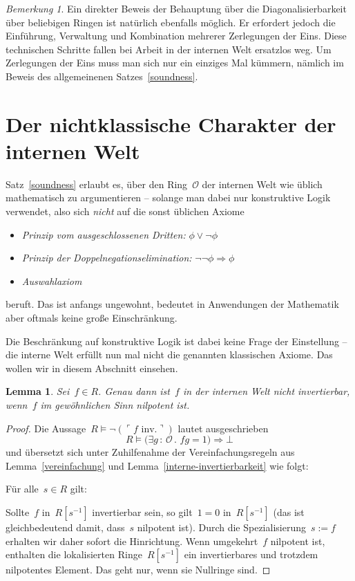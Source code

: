 \documentclass[a4paper,ngerman,12pt]{scrartcl}
\theoremstyle{definition}
\theoremstyle{plain}
\newtheorem{lemma}[defn]{Lemma}
\theoremstyle{remark}
\newtheorem{bem}[defn]{Bemerkung}
\renewcommand{\O}{\mathcal{O}}
\renewcommand{\_}{\mathpunct{.}\,}
\newcommand{\?}{\,{:}\,}
\newcommand{\speak}[1]{\ulcorner\text{#1}\urcorner}
\newenvironment{indentblock}{%
  \list{}{\leftmargin\leftmargin}%
  \item\relax
}{%
  \endlist
}
\begin{document}
\begin{bem}Ein direkter Beweis der Behauptung über die Diagonalisierbarkeit
über beliebigen Ringen ist natürlich ebenfalls möglich. Er erfordert jedoch
die Einführung, Verwaltung und Kombination mehrerer Zerlegungen der Eins. Diese
technischen Schritte fallen bei Arbeit in der internen Welt ersatzlos weg. Um
Zerlegungen der Eins muss man sich nur ein einziges Mal kümmern, nämlich im
Beweis des allgemeinenen Satzes~\ref{soundness}.\end{bem}


\section{Der nichtklassische Charakter der internen Welt}

Satz~\ref{soundness} erlaubt es, über den Ring~$\O$ der internen Welt
wie üblich mathematisch zu argumentieren -- solange man dabei nur konstruktive
Logik verwendet, also sich \emph{nicht} auf die sonst üblichen Axiome
\begin{itemize}
\item \emph{Prinzip vom ausgeschlossenen Dritten:} $\phi \vee \neg\phi$
\item \emph{Prinzip der Doppelnegationselimination:} $\neg\neg\phi \Rightarrow
\phi$
\item \emph{Auswahlaxiom}
\end{itemize}
beruft. Das ist anfangs ungewohnt, bedeutet in Anwendungen der Mathematik aber
oftmals keine große Einschränkung.

Die Beschränkung auf konstruktive Logik ist dabei keine Frage der Einstellung
-- die interne Welt erfüllt nun mal nicht die genannten klassischen Axiome. Das
wollen wir in diesem Abschnitt einsehen.

\begin{lemma}Sei~$f \in R$. Genau dann ist~$f$ in der internen Welt nicht
invertierbar, wenn~$f$ im gewöhnlichen Sinn nilpotent ist.\end{lemma}
\begin{proof}Die Aussage~$R \models \neg(\speak{$f$ inv.})$ lautet ausgeschrieben
\[ R \models \bigl(\exists g\?\O\_ fg = 1\bigr) \Rightarrow \bot \]
und übersetzt sich unter Zuhilfenahme der Vereinfachungsregeln aus Lemma~\ref{vereinfachung}
und Lemma~\ref{interne-invertierbarkeit} wie folgt:
\begin{indentblock}
Für alle~$s \in R$ gilt:
\begin{indentblock}
Sollte~$f$ in~$R[s^{-1}]$ invertierbar sein, so gilt~$1 = 0$ in~$R[s^{-1}]$
(das ist gleichbedeutend damit, dass~$s$ nilpotent ist).
\end{indentblock}
\end{indentblock}
Durch die Spezialisierung~$s := f$ erhalten wir daher sofort die Hinrichtung.
Wenn umgekehrt~$f$ nilpotent ist, enthalten die lokalisierten Ringe~$R[s^{-1}]$
ein invertierbares und trotzdem nilpotentes Element. Das geht nur, wenn sie
Nullringe sind.
\end{proof}
\end{document}
